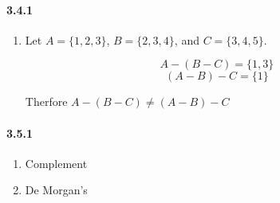\documentclass[11pt, letterpaper, twocolumn, fleqn]{article}
\begin{document}
    \paragraph{3.4.1}
    \renewcommand{\labelenumi}{\alph{enumi}.}
    \begin{enumerate}
        \item Let $A = \{1,2,3\}$, $B = \{2,3,4\}$, and $C = \{3,4,5\}$. 
        
        $$
            A-(B-C) = \{1,3\}
        $$
        $$
            (A-B)-C = \{1\}
        $$
        
        Therfore $A-(B-C) \neq (A-B)-C$
    \end{enumerate}
    
    \paragraph{3.5.1}
    \renewcommand{\labelenumi}{\alph{enumi}.}
    \begin{enumerate}
        \item Complement
        \addtocounter{enumi}{1}
        \item De Morgan's 
    \end{enumerate}
    
\end{document}
